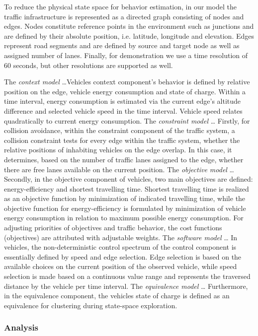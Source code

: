 \documentclass[conference]{../cls/IEEEtran}
\begin{document}
To reduce the physical state space for behavior estimation, in our model the
traffic infrastructure is represented as a directed graph consisting of nodes
and edges. Nodes constitute reference points in the environment such as
junctions and are defined by their absolute position, i.e.
latitude, longitude and elevation. Edges represent road segments and are defined
by source and target node as well as assigned number of
lanes. Finally, for demonstration we use a time resolution of 60 seconds, but
other resolutions are supported as well.

The \textit{context model} \ldots Vehicles
context component's behavior is defined by relative position on the edge, vehicle energy
consumption and state of charge. Within a time interval, energy consumption
is estimated via the current edge's altitude difference and selected
vehicle speed in the time interval. Vehicle speed relates quadratically to
current energy consumption. 
The \textit{constraint model} \ldots
Firstly, for collision avoidance, within the constraint
component of the traffic system, a collision constraint tests for every
edge within the traffic system, whether the relative positions of inhabiting
vehicles on the edge overlap. In this case, it determines, based on the number of traffic
lanes assigned to the edge, whether there are free lanes available on the
current position.
The \textit{objective model} \ldots
Secondly, in the objective component of vehicles, two main
objectives are defined: energy-efficiency and shortest travelling time.
Shortest travelling time is realized as
an objective function by minimization of indicated travelling time, while the
objective function for energy-efficiency is formulated by minimization of vehicle
energy consumption in relation to maximum possible energy consumption.
For adjusting priorities of objectives and traffic
behavior, the cost functions (objectives) are attributed with adjustable
weights.
The \textit{software model} \ldots
In vehicles, the non-deterministic control spectrum of the control
component is essentially defined by speed and edge selection.
Edge selection is based on the available choices on the current position of the observed
vehicle, while speed selection is made based on a continuous value range and
represents the traversed distance by the vehicle per time interval.
The \textit{equivalence model} \ldots 
Furthermore, in the equivalence component, the
vehicles state of charge is defined as an equivalence for clustering during state-space exploration.

\subsubsection{Analysis}
\end{document}
